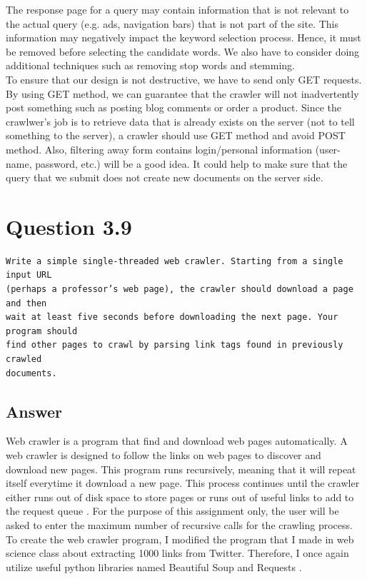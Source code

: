 \documentclass[letterpaper,11pt]{article}
\begin{document}
The response page for a query may contain information that is not relevant to the actual query (e.g. ads, navigation bars) that is not part of the site. This information may negatively impact the keyword selection process. Hence, it must be removed before selecting the candidate words. We also have to consider doing additional techniques such as removing stop words and stemming. \\
To ensure that our design is not destructive, we have to send only GET requests. By using GET method, we can guarantee that the crawler will not inadvertently post something such as posting blog comments or order a product. Since the crawlwer's job is to retrieve data that is already exists on the server (not to tell something to the server), a crawler should use GET method and avoid POST method. Also, filtering away form contains login/personal information (user-name, password, etc.) will be a good idea. It could help to make sure that the query that we submit does not create new documents on the server side. 

\noindent\makebox[\linewidth]{\rule{\textwidth}{0.4pt}}

\section*{Question 3.9}
\begin{verbatim}
Write a simple single-threaded web crawler. Starting from a single input URL
(perhaps a professor’s web page), the crawler should download a page and then
wait at least five seconds before downloading the next page. Your program should
find other pages to crawl by parsing link tags found in previously crawled
documents.
\end{verbatim}

\subsection*{Answer}
Web crawler is a program that find and download web pages automatically. A web crawler is designed to follow the links on web pages to discover and download new pages. This program runs recursively, meaning that it will repeat itself everytime it download a new page. This process continues until the crawler either runs out of disk space to store pages or runs out of useful links to add to the request queue  \cite{Croft:2009:SEI:1516224}. For the purpose of this assignment only, the user will be asked to enter the maximum number of recursive calls for the crawling process. 
To create the web crawler program, I modified the program that I made in web science class about extracting 1000 links from Twitter. Therefore, I once again utilize useful python libraries named Beautiful Soup \cite{bs4} and Requests \cite{requests}. 
\end{document}
